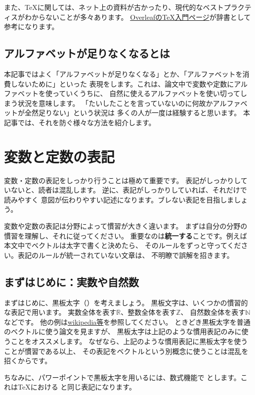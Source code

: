 \documentclass[uplatex,twocolumn,9pt,dvipdfmx]{jsarticle}
\begin{document}
また、TeXに関しては、ネット上の資料が古かったり、現代的なベストプラクティスがわからないことが多々あります。
\href{https://www.overleaf.com/learn/latex/Main_Page}{OverleafのTeX入門ページ}が辞書として参考になります。

\subsection{アルファベットが足りなくなるとは}
本記事ではよく「アルファベットが足りなくなる」とか、「アルファベットを消費しないために」といった
表現をします。これは、論文中で変数や定数にアルファベットを使っていくうちに、
自然に使えるアルファベットを使い切ってしまう状況を意味します。
「たいしたことを言っていないのに何故かアルファベットが全然足りない」という状況は
多くの人が一度は経験すると思います。
本記事では、それを防ぐ様々な方法を紹介します。






\section{変数と定数の表記}
変数・定数の表記をしっかり行うことは極めて重要です。
表記がしっかりしていないと、読者は混乱します。
逆に、表記がしっかりしていれば、それだけで読みやすく
意図が伝わりやすい記述になります。ブレない表記を目指しましょう。

変数や定数の表記は分野によって慣習が大きく違います。
まずは自分の分野の慣習を理解し、それに従ってください。
重要なのは\textbf{統一する}ことです。例えば本文中でベクトルは太字で書くと決めたら、
そのルールをずっと守ってください。表記のルールが統一されていない文章は、
不明瞭で誤解を招きます。


\subsection{まずはじめに：実数や自然数}
まずはじめに、黒板太字（\texttt{\mathbb}）を考えましょう。
黒板文字は、いくつかの慣習的な表記で用います。
実数全体を表す$\mathbb{R}$、整数全体を表す$\mathbb{Z}$、
自然数全体を表す$\mathbb{N}$などです。
他の例は\href{https://en.wikipedia.org/wiki/Blackboard_bold}{wikipedia等}を参照してください。
ときどき黒板太字を普通のベクトルに使う論文を見ますが、
黒板太字は上記のような慣用表記のみに使うことをオススメします。
なぜなら、上記のような慣用表記に黒板太字を使うことが慣習である以上、
その表記をベクトルという別概念に使うことは混乱を招くからです。

ちなみに、パワーポイントで黒板太字を用いるには、数式機能で
\texttt{\doubleR}とします。これはTeXにおける
\texttt{}と同じ表記になります。
\end{document}

